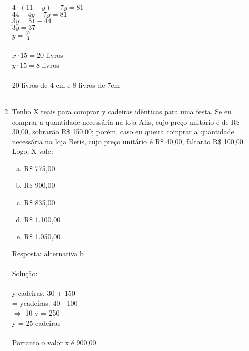 \documentclass[a4paper,14pt]{article}
\begin{document}
\begin{multicols}{2}
\begin{enumerate}
	    $4 \cdot (11 - y) + 7y = 81$ \\
	    $44 - 4y + 7y = 81$ \\
	    $3y = 81 - 44$ \\ 
	    $3y = 37$ \\ $y = \frac{37}{3}$ \\\\
	    $x \cdot 15 = 20$ livros \\
	    $y \cdot 15 = 8$ livros \\\\
	    20 livros de 4 cm e 8 livros de 7cm\\\\
	
		\item Tenho X reais para comprar y cadeiras idênticas para uma festa. Se eu comprar a quantidade necessária na loja Alis, cujo preço unitário é de R\$ 30,00, sobrarão R\$ 150,00; porém, caso eu queira comprar a quantidade necessária na loja Betis, cujo preço unitário é R\$ 40,00, faltarão R\$ 100,00. Logo, X vale:
		\begin{enumerate}[a)]
			\item R\$ 775,00
			\item R\$ 900,00
			\item R\$ 835,00
			\item R\$ 1.100,00
			\item R\$ 1.050,00
		\end{enumerate}
	    Resposta: alternativa b \\\\
	    Solução: \\\\
	    y cadeiras. 30 + 150 \\ 
	    = ycadeiras. 40 - 100 \\ 
	    $\Rightarrow$ 10 y = 250 \\ 
	    y = 25 cadeiras \\\\
	    Portanto o valor x é 900,00 \\\\

\end{enumerate}
\end{multicols}
\end{document}
